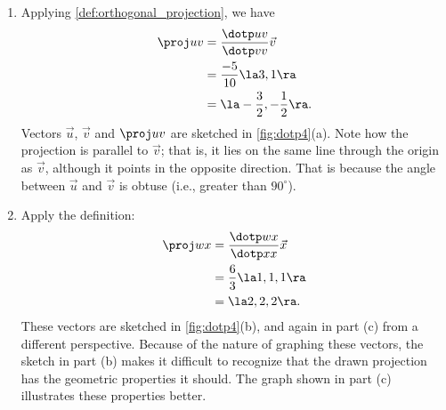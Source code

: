{\begin{enumerate}
	\item Applying \autoref{def:orthogonal_projection}, we have
	\begin{align*}
	\proj uv &= \frac{\dotp uv}{\dotp vv}\vec v \\
					&= \frac{-5}{10}\la 3,1\ra\\
					&= \la -\frac32,-\frac12\ra.
	\end{align*}
	Vectors $\vec u$, $\vec v$ and $\proj uv$ are sketched in \autoref{fig:dotp4}(a). Note how the projection is parallel to $\vec v$; that is, it lies on the same line through the origin as $\vec v$, although it points in the opposite direction. That is because the angle between $\vec u$ and $\vec v$ is obtuse (i.e., greater than $90^\circ$).
	

	\item		Apply the definition:
	\begin{align*}
	\proj wx &= \frac{\dotp wx}{\dotp xx}\vec x \\
					&= \frac{6}{3}\la 1,1,1\ra\\
					&= \la 2,2,2\ra.
	\end{align*}
	These vectors are sketched in \autoref{fig:dotp4}(b), and again in part (c) from a different perspective. Because of the nature of graphing these vectors, the sketch in part (b) makes it difficult  to recognize that the drawn projection has the geometric properties it should. The graph shown in part (c) illustrates these properties better.
\end{enumerate}}


